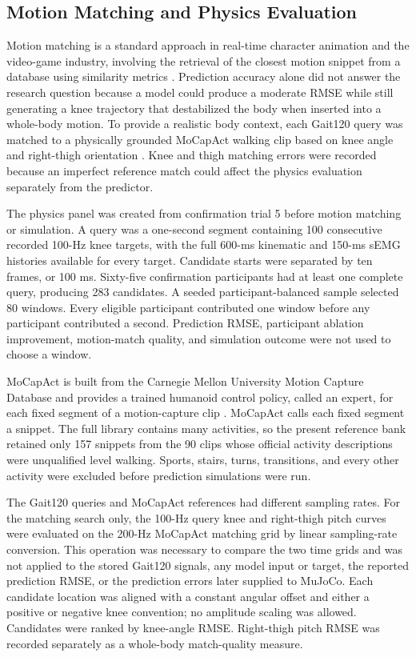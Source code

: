 \documentclass[referee,lineno,pdflatex,sn-vancouver-num]{sn-jnl}
\begin{document}
\subsection{Motion Matching and Physics Evaluation}

Motion matching is a standard approach in real-time character animation and the video-game industry, involving the retrieval of the closest motion snippet from a database using similarity metrics \cite{clavet2016}. Prediction accuracy alone did not answer the research question because a model could produce a moderate RMSE while still generating a knee trajectory that destabilized the body when inserted into a whole-body motion. To provide a realistic body context, each Gait120 query was matched to a physically grounded MoCapAct walking clip based on knee angle and right-thigh orientation \cite{wagener2022}. Knee and thigh matching errors were recorded because an imperfect reference match could affect the physics evaluation separately from the predictor.

The physics panel was created from confirmation trial 5 before motion matching or simulation. A query was a one-second segment containing 100 consecutive recorded 100-Hz knee targets, with the full 600-ms kinematic and 150-ms sEMG histories available for every target. Candidate starts were separated by ten frames, or 100 ms. Sixty-five confirmation participants had at least one complete query, producing 283 candidates. A seeded participant-balanced sample selected 80 windows. Every eligible participant contributed one window before any participant contributed a second. Prediction RMSE, participant ablation improvement, motion-match quality, and simulation outcome were not used to choose a window.

MoCapAct is built from the Carnegie Mellon University Motion Capture Database and provides a trained humanoid control policy, called an expert, for each fixed segment of a motion-capture clip \cite{wagener2022}. MoCapAct calls each fixed segment a snippet. The full library contains many activities, so the present reference bank retained only 157 snippets from the 90 clips whose official activity descriptions were unqualified level walking. Sports, stairs, turns, transitions, and every other activity were excluded before prediction simulations were run.

The Gait120 queries and MoCapAct references had different sampling rates. For the matching search only, the 100-Hz query knee and right-thigh pitch curves were evaluated on the 200-Hz MoCapAct matching grid by linear sampling-rate conversion. This operation was necessary to compare the two time grids and was not applied to the stored Gait120 signals, any model input or target, the reported prediction RMSE, or the prediction errors later supplied to MuJoCo. Each candidate location was aligned with a constant angular offset and either a positive or negative knee convention; no amplitude scaling was allowed. Candidates were ranked by knee-angle RMSE. Right-thigh pitch RMSE was recorded separately as a whole-body match-quality measure.
\end{document}
